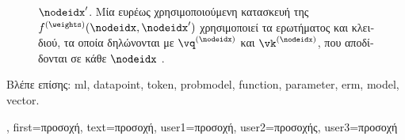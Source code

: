 {{\begin{figure}[H]
{{			 $\nodeidx'$. 
			\foreignlanguage{greek}{Μία ευρέως χρησιμοποιούμενη κατασκευή της $f^{(\weights)}(\nodeidx,\nodeidx')$ 
			χρησιμοποιεί τα}  \foreignlanguage{greek}{ερωτήματος και κλειδιού, τα οποία δηλώνονται 
			με $\vq^{(\nodeidx)}$ και $\vk^{(\nodeidx)}$, που αποδίδονται σε κάθε}  $\nodeidx$ 
			\cite{vaswani2017attention}. \label{fig_attention_dict}} }
		\end{figure}
		\foreignlanguage{greek}{Βλέπε επίσης:} \gls{ml}, \gls{datapoint}, \gls{token}, \gls{probmodel}, \gls{function}, \gls{parameter}, \gls{erm}, 
		\gls{model}, \gls{vector}.},
	first={\foreignlanguage{greek}{προσοχή}},
	text={\foreignlanguage{greek}{προσοχή}},
	user1={\foreignlanguage{greek}{προσοχή}}, %
   	user2={\foreignlanguage{greek}{προσοχής}}, %
	user3={\foreignlanguage{greek}{προσοχή}} %
}

